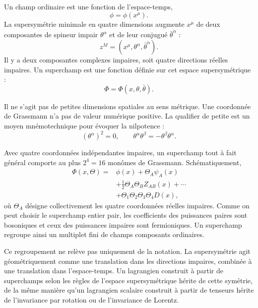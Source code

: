 Un champ ordinaire est une fonction de l’espace-temps,
\begin{equation}
\phi=\phi(x^\mu).
\end{equation}
La supersymétrie minimale en quatre dimensions augmente \(x^\mu\) de deux composantes de spineur impair \(\theta^\alpha\) et de leur conjugué \(\bar\theta^{\dot\alpha}\) :
\begin{equation}
z^M=(x^\mu,\theta^\alpha,\bar\theta^{\dot\alpha}).
\end{equation}
Il y a deux composantes complexes impaires, soit quatre directions réelles impaires. Un superchamp est une fonction définie sur cet espace supersymétrique :
\begin{equation}
\Phi=\Phi(x,\theta,\bar\theta).
\end{equation}

Il ne s’agit pas de petites dimensions spatiales au sens métrique. Une coordonnée de Grassmann n’a pas de valeur numérique positive. La qualifier de petite est un moyen mnémotechnique pour évoquer la nilpotence :
\begin{equation}
(\theta^\alpha)^2=0,
\qquad
\theta^\alpha\theta^\beta=-\theta^\beta\theta^\alpha.
\end{equation}

Avec quatre coordonnées indépendantes impaires, un superchamp tout à fait général comporte au plus \(2^4=16\) monômes de Grassmann. Schématiquement,
\begin{equation}
\begin{aligned}
\Phi(x,\Theta)={}&\phi(x)+\Theta_A\psi_A(x)\\
&+\frac{1}{2}\Theta_A\Theta_B Z_{AB}(x)+\cdots\\
&+\Theta_1\Theta_2\Theta_3\Theta_4D(x),
\end{aligned}
\end{equation}
où \(\Theta_A\) désigne collectivement les quatre coordonnées réelles impaires. Comme on peut choisir le superchamp entier pair, les coefficients des puissances paires sont bosoniques et ceux des puissances impaires sont fermioniques. Un superchamp regroupe ainsi un multiplet fini de champs composants ordinaires.

Ce regroupement ne relève pas uniquement de la notation. La supersymétrie agit géométriquement comme une translation dans les directions impaires, combinée à une translation dans l’espace-temps. Un lagrangien construit à partir de superchamps selon les règles de l’espace supersymétrique hérite de cette symétrie, de la même manière qu’un lagrangien scalaire construit à partir de tenseurs hérite de l’invariance par rotation ou de l’invariance de Lorentz.

